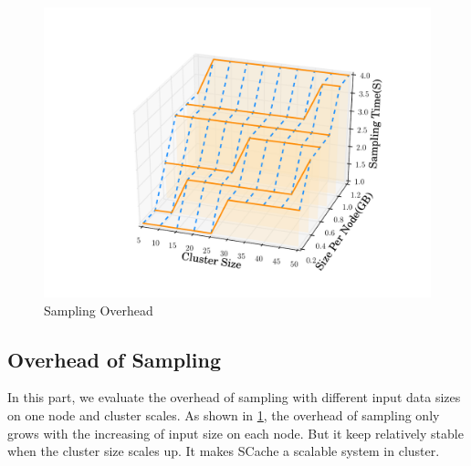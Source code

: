 \begin{figure}
	\includegraphics[width=\linewidth]{fig/sampling}
	\caption{Sampling Overhead}
	\label{fig:sampling}
\end{figure}
\subsection{Overhead of Sampling}
In this part, we evaluate the overhead of sampling with different input data sizes on one node and cluster scales. As shown in \ref{fig:sampling}, the overhead of sampling only grows with the increasing of input size on each node. But it keep relatively stable when the cluster size scales up. It makes SCache a scalable system in cluster.

